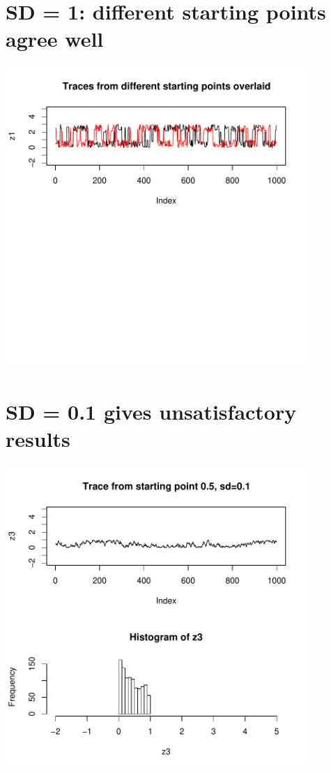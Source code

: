 \es\bs
\section*{SD = 1: different starting points agree well}
\centerline{\includegraphics[height=4.5in]{figures/goodtrace3.pdf}}

\es\bs

\section*{SD = 0.1 gives unsatisfactory results}
\centerline{\includegraphics[height=4.5in]{figures/badtrace1.pdf}}
\es\bs

